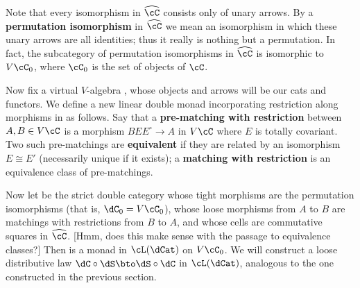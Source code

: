 \documentclass{amsart}
\let\oc\circ
\newcommand{\C}{\cC}
\renewcommand{\Chat}{\ensuremath{\widehat{\C}}\xspace}
\renewcommand{\o}{^{\circ}}
\begin{document}
Note that every isomorphism in \Chat consists only of unary arrows.
By a \textbf{permutation isomorphism} in \Chat we mean an isomorphism in which these unary arrows are all identities; thus it really is nothing but a permutation.
In fact, the subcategory of permutation isomorphisms in $\Chat$ is isomorphic to $V\C_0$, where $\C_0$ is the set of objects of $\C$.

Now fix a virtual $V$-algebra \C, whose objects and arrows will be our cats and functors.
We define a new linear double monad incorporating restriction along morphisms in \C as follows.
Say that a \textbf{pre-matching with restriction} between $A,B\in V\C$ is a morphism $B E E\o \to A$ in $V\C$ where $E$ is totally covariant.
Two such pre-matchings are \textbf{equivalent} if they are related by an isomorphism $E\cong E'$ (necessarily unique if it exists); a \textbf{matching with restriction} is an equivalence class of pre-matchings.

Now let \dC be the strict double category whose tight morphisms are the permutation isomorphisms (that is, $\dC_0 = V\C_0$), whose loose morphisms from $A$ to $B$ are matchings with restrictions from $B$ to $A$, and whose cells are commutative squares in $\Chat$.
[Hmm, does this make sense with the passage to equivalence classes?]
Then \dC is a monad in $\cL(\dCat)$ on $V\C_0$.
We will construct a loose distributive law $\dC \oc \dS \bto \dS\oc \dC$ in $\cL(\dCat)$, analogous to the one constructed in the previous section.
\end{document}
